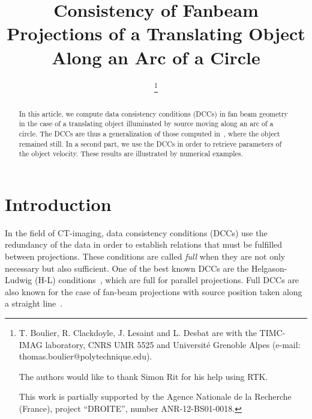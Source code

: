 \documentclass[twocolumn]{IEEEtran}
\title{Consistency of Fanbeam Projections of a Translating Object Along an Arc of a Circle}
\date{}
\begin{document}
\author{
	\thanks{T. Boulier, R. Clackdoyle, J. Lesaint and L. Desbat are with the TIMC-IMAG laboratory, CNRS UMR 5525 and Universit\'e Grenoble Alpes (e-mail: thomas.boulier@polytechnique.edu).

	The authors would like to thank Simon Rit for his help using RTK.
			
	This work is partially supported by the Agence Nationale de la Recherche (France), project ``DROITE'', number ANR-12-BS01-0018.
}		
\IEEEauthorblockA{}
}

\maketitle

\begin{abstract}
In this article, we compute data consistency conditions
(DCCs) in fan beam geometry in the case of a translating object illuminated by source moving along an arc of a circle. The DCCs are thus a generalization of those computed in~\cite{clackdoyle2015consistency}, where the object remained still. In a second part, we use the DCCs in order to retrieve parameters of the object velocity. These results are illustrated by numerical examples.
\end{abstract}

\section{Introduction}

In the field of CT-imaging, data consistency conditions (DCCs) use the redundancy of the data in order to establish relations that must be fulfilled  between projections. These conditions are called \emph{full} when they are not only necessary but also sufficient. One of the best known DCCs are the Helgason-Ludwig (H-L) conditions~\cite{helgason1980radon,ludwig1966radon}, which are full for parallel projections. Full DCCs are also known for the case of fan-beam projections with source position taken along a straight line~\cite{clackdoyle2013necessary}.
\end{document}
